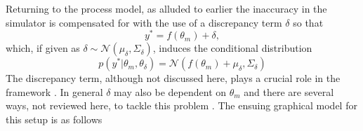 \documentclass[10pt,a4paper]{article}
\newcommand{\intd} {\textrm{d}}
\begin{document}
Returning to the process model, as alluded to earlier the inaccuracy in the simulator is compensated for with the use of a discrepancy term $\delta$ so that
\begin{equation}
y^* = f(\theta_{m}) + \delta,
\end{equation}
\noindent which, if given as $\delta \sim \mathcal{N}(\mu_\delta,\Sigma_\delta)$, induces the conditional distribution 
\begin{equation}
p(y^* | \theta_m, \theta_\delta) = \mathcal{N}(f(\theta_m) + \mu_\delta, \Sigma_\delta)
\end{equation}
\noindent The discrepancy term, although not discussed here, plays a crucial role in the framework \citep{Brynjarsdottir_2013}. In general $\delta$ may also be dependent on $\theta_m$ and there are several ways, not reviewed here, to tackle this problem \citep[e.g.][]{Rougier_2007}. 
The ensuing graphical model for this setup is as follows
\begin{figure}[h!]
\centering
{}
\end{figure}
\end{document}
